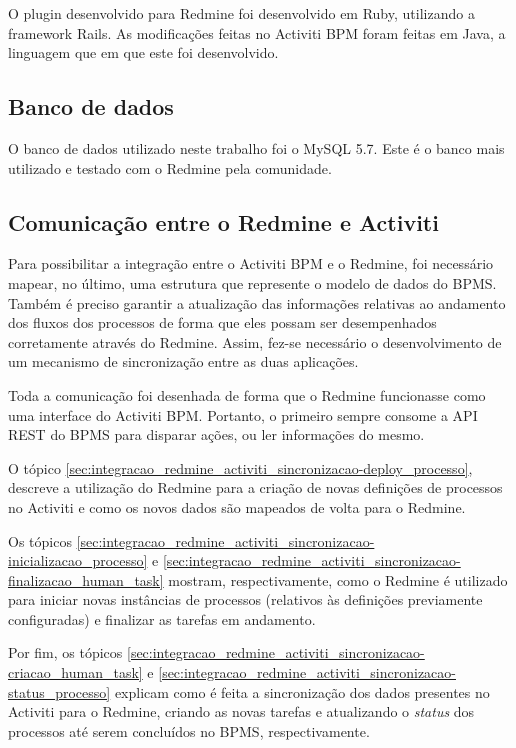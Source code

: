O plugin desenvolvido para Redmine foi desenvolvido em Ruby\cite{ruby-lang}, utilizando a framework Rails\cite{rails}.
As modificações feitas no Activiti BPM foram feitas em Java, a linguagem que em que este foi desenvolvido.

\subsection{Banco de dados}\label{sec:integracao_redmine_activiti_implementacao__bd}

O banco de dados utilizado neste trabalho foi o MySQL 5.7. Este é o banco mais utilizado e testado com o Redmine pela comunidade.

\subsection{Comunicação entre o Redmine e Activiti}\label{sec:integracao_redmine_activiti_implementacao_sincronizacao}

Para possibilitar a integração entre o Activiti BPM e o Redmine, foi necessário mapear, no último, uma estrutura que represente o modelo de dados do BPMS. Também é preciso garantir a atualização das informações relativas ao andamento dos fluxos dos processos de forma que eles possam ser desempenhados corretamente através do Redmine. Assim, fez-se necessário o desenvolvimento de um mecanismo de sincronização entre as duas aplicações.

Toda a comunicação foi desenhada de forma que o Redmine funcionasse como uma interface do Activiti BPM. Portanto, o primeiro sempre consome a API REST do BPMS para disparar ações, ou ler informações do mesmo.

O tópico \ref{sec:integracao_redmine_activiti_sincronizacao-deploy_processo}, descreve a utilização do Redmine para  a criação de novas definições de processos no Activiti e como os novos dados são mapeados de volta para o Redmine. 

Os tópicos \ref{sec:integracao_redmine_activiti_sincronizacao-inicializacao_processo} e \ref{sec:integracao_redmine_activiti_sincronizacao-finalizacao_human_task} mostram, respectivamente, como o Redmine é utilizado para iniciar novas instâncias de processos (relativos às definições previamente configuradas) e finalizar as tarefas em andamento.

Por fim, os tópicos \ref{sec:integracao_redmine_activiti_sincronizacao-criacao_human_task} e \ref{sec:integracao_redmine_activiti_sincronizacao-status_processo} explicam como é feita a sincronização dos dados presentes no Activiti para o Redmine, criando as novas tarefas e atualizando o \textit{status} dos processos até serem concluídos no BPMS, respectivamente.

